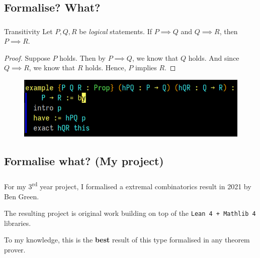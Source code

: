 \subsection{Formalise? What? }
\begin{frame}\frametitle{\insertsubsection}

\begin{block}{Transitivity}
  Let \(P, Q, R\) be \textit{logical} statements. If \(P \implies Q\) and \(Q \implies R\), then \(P \implies R\).
\end{block}

\begin{proof}
  Suppose \(P\) holds. Then by \(P \implies Q\), we know that \(Q\) holds. And since \(Q \implies R\), we know that \(R\) holds. Hence, \(P\) implies \(R\).
\end{proof}

\begin{figure}
  \includegraphics[scale=0.6]{images/demo.png}
\end{figure}

\end{frame}



%
%



\subsection{Formalise what? (My project)}
\begin{frame}\frametitle{\insertsubsection}

For my 3\textsuperscript{rd} year project, I formalised a extremal combinatorics result in 2021 by Ben Green.

The resulting project is original work building on top of the \texttt{Lean 4 + Mathlib 4} libraries.

To my knowledge, this is the \textbf{best} result of this type formalised in any theorem prover.

\end{frame}
